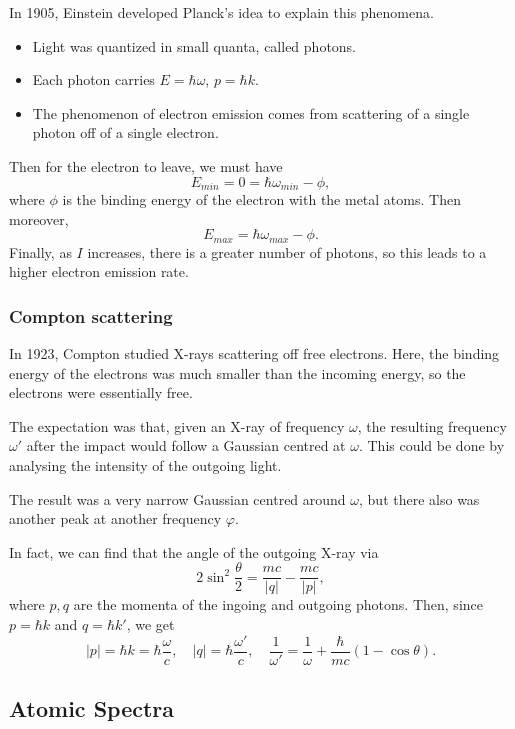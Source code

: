 \documentclass[12pt]{article}
\begin{document}
In 1905, Einstein developed Planck's idea to explain this phenomena.
\begin{itemize}
	\item Light was quantized in small quanta, called photons.
	\item Each photon carries $E = \hbar \omega$, $p = \hbar k$.
	\item The phenomenon of electron emission comes from scattering of a single photon off of a single electron.
\end{itemize}

Then for the electron to leave, we must have
\[
E_{min} = 0  = \hbar \omega_{min} - \phi
,\]
where $\phi$ is the binding energy of the electron with the metal atoms. Then moreover,
\[
E_{max} = \hbar \omega_{max} - \phi
.\]
Finally, as $I$ increases, there is a greater number of photons, so this leads to a higher electron emission rate.

\subsubsection{Compton scattering}%
\label{subsub:compton_scattering}

In 1923, Compton studied X-rays scattering off free electrons. Here, the binding energy of the electrons was much smaller than the incoming energy, so the electrons were essentially free.

The expectation was that, given an X-ray of frequency $\omega$, the resulting frequency $\omega'$ after the impact would follow a Gaussian centred at $\omega$. This could be done by analysing the intensity of the outgoing light.

The result was a very narrow Gaussian centred around $\omega$, but there also was another peak at another frequency $\varphi$.

In fact, we can find that the angle of the outgoing X-ray via
\[
2 \sin^2 \frac{\theta}{2} = \frac{mc}{|q|} - \frac{mc}{|p|}
,\]
where $p, q$ are the momenta of the ingoing and outgoing photons. Then, since $p = \hbar k$ and $q = \hbar k'$, we get
\[
	|p| = \hbar k = \hbar \frac{\omega}{c}, \quad |q| = \hbar \frac{\omega'}{c}, \quad \frac{1}{\omega'} = \frac{1}{\omega} + \frac{\hbar}{mc}(1 - \cos \theta)
.\]

\subsection{Atomic Spectra}%
\label{sub:atomic_spectra}
\end{document}
